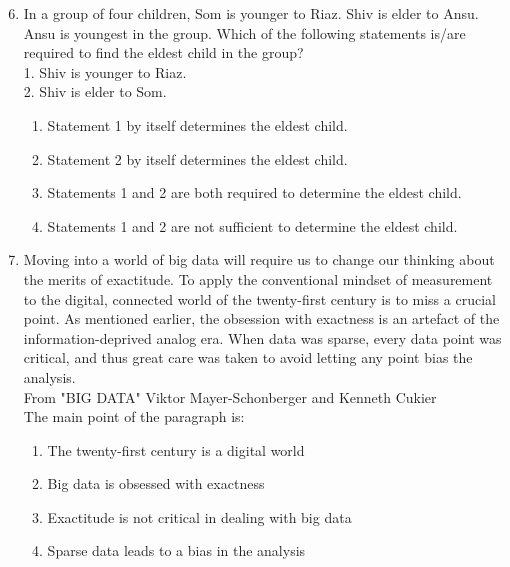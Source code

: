 \documentclass[journal,12pt,onecolumn]{IEEEtran}
\theoremstyle{remark}
\begin{document}
\begin{enumerate}
\setcounter{enumi}{5}

    \item In a group of four children, Som is younger to Riaz. Shiv is elder to Ansu. Ansu is youngest in the group. Which of the following statements is/are required to find the eldest child in the group? \\
    1. Shiv is younger to Riaz. \\
    2. Shiv is elder to Som.

    \hfill{}
    \begin{enumerate}
        \item Statement 1 by itself determines the eldest child.
        \item Statement 2 by itself determines the eldest child.
        \item Statements 1 and 2 are both required to determine the eldest child.
        \item Statements 1 and 2 are not sufficient to determine the eldest child.
    \end{enumerate}

    
    
    \item Moving into a world of big data will require us to change our thinking about the merits of exactitude. To apply the conventional mindset of measurement to the digital, connected world of the twenty-first century is to miss a crucial point. As mentioned earlier, the obsession with exactness is an artefact of the information-deprived analog era. When data was sparse, every data point was critical, and thus great care was taken to avoid letting any point bias the analysis. \\
    From "BIG DATA" Viktor Mayer-Schonberger and Kenneth Cukier \\
    The main point of the paragraph is:

    \hfill{}
    \begin{enumerate}
        \item The twenty-first century is a digital world
        \item Big data is obsessed with exactness
        \item Exactitude is not critical in dealing with big data
        \item Sparse data leads to a bias in the analysis
    \end{enumerate}


\end{enumerate}
\end{document}
